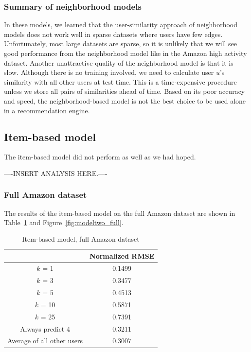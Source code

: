 \documentclass[letterpaper, 11 pt, conference]{ieeeconf}
\begin{document}
\subsubsection{Summary of neighborhood models}
In these models, we learned that the user-similarity approach of neighborhood 
models does not work well in sparse datasets where users have few edges. 
Unfortunately, most large datasets are sparse, so it is unlikely that we will 
see good performance from the neighborhood model like in the Amazon high 
activity dataset. Another unattractive quality of the neighborhood model is 
that it is slow. Although there is no training involved, we need to calculate 
user $u$'s similarity with all other users at test time. This is a 
time-expensive procedure unless we store all pairs of similarities 
ahead of time. Based on its poor accuracy and speed, the neighborhood-based 
model is not the best choice to be used alone in a recommendation engine.


\subsection{Item-based model}

The item-based model did not perform as well as we had hoped.

----INSERT ANALYSIS HERE.----

\subsubsection{Full Amazon dataset}
The results of the item-based model on the full Amazon dataset 
are shown in Table~\ref{table:modeltwo_full} and Figure~\ref{fig:modeltwo_full}.

\begin{table}[htb]
\centering
\begin{tabular}{|c|c|}
\cline{2-2}

\multicolumn{1}{c|}{}  & {Normalized RMSE} \tabularnewline \hline
$k$ = 1 & 0.1499 \tabularnewline
$k$ = 3 & 0.3477 \tabularnewline
$k$ = 5 & 0.4513 \tabularnewline
$k$ = 10 & 0.5871 \tabularnewline
$k$ = 25 & 0.7391 \tabularnewline
\hline
Always predict 4 & 0.3211 \tabularnewline 
Average of all other users & 0.3007 \tabularnewline

\hline
\end{tabular}
\caption{Item-based model, full Amazon dataset}
\label{table:modeltwo_full}
\end{table}
\end{document}
